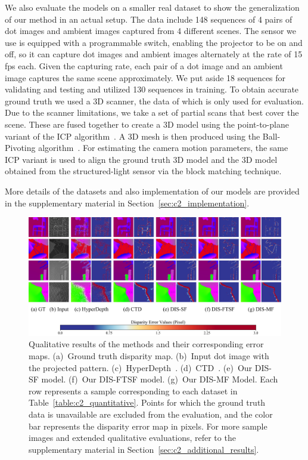 We also evaluate the models on a smaller real dataset to show the generalization of our method in an actual setup. The data include 148 sequences of 4 pairs of dot images and ambient images captured from 4 different scenes. The sensor we use is equipped with a programmable switch, enabling the projector to be on and off, so it can capture dot images and ambient images alternately at the rate of 15 fps each. Given the capturing rate, each pair of a dot image and an ambient image captures the same scene approximately. We put aside 18 sequences for validating and testing and utilized 130 sequences in training. To obtain accurate ground truth we used a 3D scanner, the data of which is only used for evaluation. Due to the scanner limitations, we take a set of partial scans that best cover the scene. These are fused together to create a 3D model using the point-to-plane variant of the ICP algorithm~\citep{Chen1992ObjectMB}. A 3D mesh is then produced using the Ball-Pivoting algorithm~\citep{bernardini99ball}. For estimating the camera motion parameters, the same ICP variant is used to align the ground truth 3D model and the 3D model obtained from the structured-light sensor via the block matching technique.

More details of the datasets and also implementation of our models are provided in the supplementary material in Section~\ref{sec:c2_implementation}.

\begin{figure}
    \begin{center}
        \includegraphics[width=1\linewidth]{images/chapter2/figures/Fig4.jpg}
    \end{center}
   \caption{Qualitative results of the methods and their corresponding error maps. (a)~Ground truth disparity map. (b)~Input dot image with the projected pattern. (c)~HyperDepth~\citep{ryan2016hyperdepth}. (d)~CTD~\citep{riegler2019connecting}. (e)~Our DIS-SF model. (f)~Our DIS-FTSF model. (g)~Our DIS-MF Model. Each row represents a sample corresponding to each dataset in Table~\ref{table:c2_quantitative}. Points for which the ground truth data is unavailable are excluded from the evaluation, and the color bar represents the disparity error map in pixels. For more sample images and extended qualitative evaluations, refer to the supplementary material in Section~\ref{sec:c2_additional_results}.}
    \label{fig:c2_results}
\end{figure}

